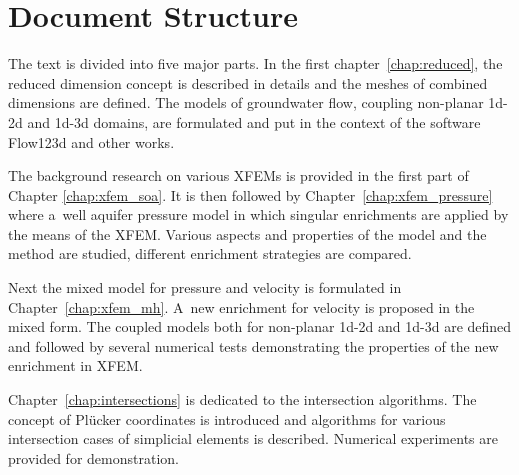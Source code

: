 




\section{Document Structure} \label{sec:structure}

The text is divided into five major parts.
In the first chapter~\ref{chap:reduced}, the reduced dimension concept is described in details and the meshes of combined dimensions are defined.
The models of groundwater flow, coupling non-planar 1d-2d and 1d-3d domains, are formulated and put in the context of the software Flow123d 
and other works.


The background research on various XFEMs is provided in the first part of Chapter \ref{chap:xfem_soa}.
It is then followed by Chapter~\ref{chap:xfem_pressure} where a~well aquifer pressure model
in which singular enrichments are applied by the means of the XFEM.
Various aspects and properties of the model and the method are studied, different enrichment strategies are compared. 


Next the mixed model for pressure and velocity is formulated in Chapter~\ref{chap:xfem_mh}.
A~new enrichment for velocity is proposed in the mixed form.
The coupled models both for non-planar 1d-2d and 1d-3d are defined and followed by several
numerical tests demonstrating the properties of the new enrichment in XFEM.

Chapter~\ref{chap:intersections} is dedicated to the intersection algorithms.
The concept of Pl\"ucker coordinates is introduced and algorithms for various intersection cases
of simplicial elements is described. Numerical experiments are provided for demonstration.


